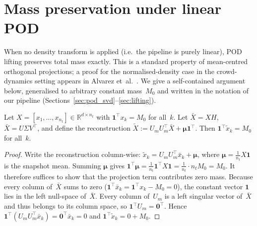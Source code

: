 \enlargethispage{2\baselineskip}
\section{Mass preservation under linear POD}
\label{sec:mass_preservation}

When no density transform is applied (i.e.\ the pipeline is purely linear),
POD lifting preserves total mass exactly.
This is a standard property of mean-centred orthogonal projections; a proof
for the normalised-density case in the crowd-dynamics setting appears in
Alvarez et~al.~\cite[Proposition~1]{alvarez2025eqfree}.
We give a self-contained argument below, generalised to arbitrary
constant mass~$M_0$ and written in the notation of our pipeline
(Sections~\ref{sec:pod_svd}--\ref{sec:lifting}).

\begin{proposition}
\label{prop:mass_preservation}
Let $X=[x_1,\dots,x_{n_t}]\in\mathbb{R}^{d\times n_t}$ with
$\mathbf{1}^\top x_k = M_0$ for all~$k$.
Let $\bar{X}=XH$, $\bar{X}=U\Sigma V^\top$, and define the reconstruction
$\tilde{X}:=U_m U_m^\top\bar{X}+\boldsymbol{\mu}\mathbf{1}^\top$.
Then $\mathbf{1}^\top\tilde{x}_k=M_0$ for all~$k$.
\end{proposition}

\begin{proof}
Write the reconstruction column-wise:
$\tilde{x}_k = U_m U_m^\top \bar{x}_k + \boldsymbol{\mu}$,
where $\boldsymbol{\mu} = \frac{1}{n_t}X\mathbf{1}$ is the snapshot mean.
Summing $\boldsymbol{\mu}$ gives
$\mathbf{1}^\top\boldsymbol{\mu}
 = \frac{1}{n_t}\mathbf{1}^\top X\mathbf{1}
 = \frac{1}{n_t}\cdot n_t M_0 = M_0$.
It therefore suffices to show that the projection term contributes zero mass.
Because every column of~$\bar{X}$ sums to zero
($\mathbf{1}^\top\bar{x}_k = \mathbf{1}^\top x_k - M_0 = 0$),
the constant vector $\mathbf{1}$ lies in the left null-space
of~$\bar{X}$.
Every column of~$U_m$ is a left singular vector of~$\bar{X}$ and thus
belongs to its column space, so
$\mathbf{1}^\top U_m = \mathbf{0}^\top$.
Hence
$\mathbf{1}^\top(U_m U_m^\top\bar{x}_k) = \mathbf{0}^\top\bar{x}_k = 0$
and $\mathbf{1}^\top\tilde{x}_k = 0 + M_0$.
\end{proof}

